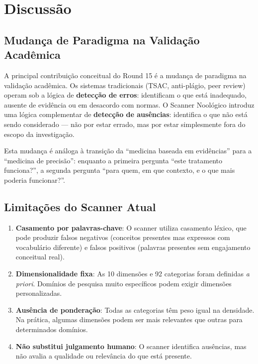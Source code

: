 \documentclass[12pt,a4paper]{article}
\begin{document}
\section{Discussão}

\subsection{Mudança de Paradigma na Validação Acadêmica}

A principal contribuição conceitual do Round 15 é a mudança de paradigma na validação acadêmica. Os sistemas tradicionais (TSAC, anti-plágio, peer review) operam sob a lógica de \textbf{detecção de erros}: identificam o que está inadequado, ausente de evidência ou em desacordo com normas. O Scanner Noológico introduz uma lógica complementar de \textbf{detecção de ausências}: identifica o que não está sendo considerado --- não por estar errado, mas por estar simplesmente fora do escopo da investigação.

Esta mudança é análoga à transição da ``medicina baseada em evidências'' para a ``medicina de precisão'': enquanto a primeira pergunta ``este tratamento funciona?'', a segunda pergunta ``para quem, em que contexto, e o que mais poderia funcionar?''.

\subsection{Limitações do Scanner Atual}

\begin{enumerate}[itemsep=1pt]
  \item \textbf{Casamento por palavras-chave}: O scanner utiliza casamento léxico, que pode produzir falsos negativos (conceitos presentes mas expressos com vocabulário diferente) e falsos positivos (palavras presentes sem engajamento conceitual real).
  \item \textbf{Dimensionalidade fixa}: As 10 dimensões e 92 categorias foram definidas \textit{a priori}. Domínios de pesquisa muito específicos podem exigir dimensões personalizadas.
  \item \textbf{Ausência de ponderação}: Todas as categorias têm peso igual na densidade. Na prática, algumas dimensões podem ser mais relevantes que outras para determinados domínios.
  \item \textbf{Não substitui julgamento humano}: O scanner identifica ausências, mas não avalia a qualidade ou relevância do que está presente.
\end{enumerate}
\end{document}
